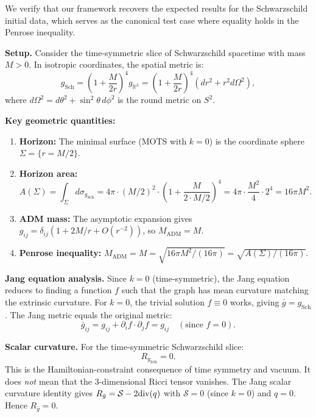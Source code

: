 \begin{example}\label{ex:SchwarzschildCheck}
We verify that our framework recovers the expected results for the Schwarzschild initial data, which serves as the canonical test case where equality holds in the Penrose inequality.

\textbf{Setup.} Consider the time-symmetric slice of Schwarzschild spacetime with mass $M > 0$. In isotropic coordinates, the spatial metric is:
\begin{equation}\label{eq:SchwarzschildIsotropic}
    g_{\mathrm{Sch}} = \left(1 + \frac{M}{2r}\right)^4 g_{\mathbb{R}^3} = \left(1 + \frac{M}{2r}\right)^4 (dr^2 + r^2 d\Omega^2),
\end{equation}
where $d\Omega^2 = d\theta^2 + \sin^2\theta \, d\phi^2$ is the round metric on $S^2$.

\textbf{Key geometric quantities:}
\begin{enumerate}
    \item \textbf{Horizon:} The minimal surface (MOTS with $k = 0$) is the coordinate sphere $\Sigma = \{r = M/2\}$.
    \item \textbf{Horizon area:} 
    \begin{equation}
        A(\Sigma) = \int_\Sigma d\sigma_{g_{\mathrm{Sch}}} = 4\pi \cdot (M/2)^2 \cdot \left(1 + \frac{M}{2 \cdot M/2}\right)^4 = 4\pi \cdot \frac{M^2}{4} \cdot 2^4 = 16\pi M^2.
    \end{equation}
    \item \textbf{ADM mass:} The asymptotic expansion gives $g_{ij} = \delta_{ij}(1 + 2M/r + O(r^{-2}))$, so $M_{\mathrm{ADM}} = M$.
    \item \textbf{Penrose inequality:} $M_{\mathrm{ADM}} = M = \sqrt{16\pi M^2/(16\pi)} = \sqrt{A(\Sigma)/(16\pi)}$. \checkmark
\end{enumerate}

\textbf{Jang equation analysis.} Since $k = 0$ (time-symmetric), the Jang equation reduces to finding a function $f$ such that the graph has mean curvature matching the extrinsic curvature. For $k = 0$, the trivial solution $f \equiv 0$ works, giving $\bar{g} = g_{\mathrm{Sch}}$. The Jang metric equals the original metric:
\begin{equation}
    \bar{g}_{ij} = g_{ij} + \partial_i f \cdot \partial_j f = g_{ij} \quad (\text{since } f = 0).
\end{equation}

\textbf{Scalar curvature.} For the time-symmetric Schwarzschild slice:
\begin{equation}
    R_{g_{\mathrm{Sch}}} = 0.
\end{equation}
This is the Hamiltonian-constraint consequence of time symmetry and vacuum. It does \emph{not} mean that the 3-dimensional Ricci tensor vanishes.
The Jang scalar curvature identity gives $R_{\bar{g}} = \mathcal{S} - 2\mathrm{div}(q)$ with $\mathcal{S} = 0$ (since $k = 0$) and $q = 0$. Hence $R_{\bar{g}} = 0$.


\end{example}

